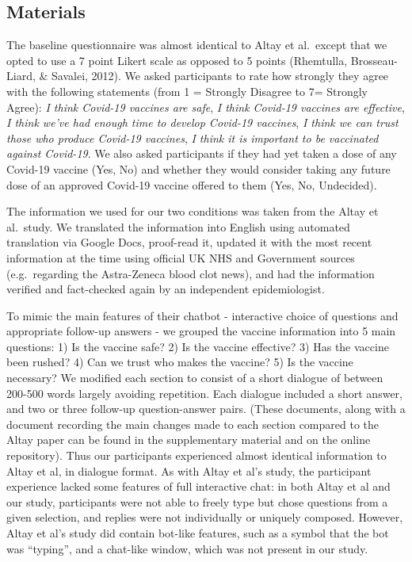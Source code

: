 \documentclass[
  english,
  ,jou,floatsintext]{apa6}
\begin{document}
\hypertarget{materials}{%
\subsection{Materials}\label{materials}}

The baseline questionnaire was almost identical to Altay et al.~except that we opted to use a 7 point Likert scale as opposed to 5 points (Rhemtulla, Brosseau-Liard, \& Savalei, 2012). We asked participants to rate how strongly they agree with the following statements (from 1 = Strongly Disagree to 7= Strongly Agree): \emph{I think Covid-19 vaccines are safe}, \emph{I think Covid-19 vaccines are effective}, \emph{I think we've had enough time to develop Covid-19 vaccines}, \emph{I think we can trust those who produce Covid-19 vaccines}, \emph{I think it is important to be vaccinated against Covid-19}. We also asked participants if they had yet taken a dose of any Covid-19 vaccine (Yes, No) and whether they would consider taking any future dose of an approved Covid-19 vaccine offered to them (Yes, No, Undecided).

The information we used for our two conditions was taken from the Altay et al.~study. We translated the information into English using automated translation via Google Docs, proof-read it, updated it with the most recent information at the time using official UK NHS and Government sources (e.g.~regarding the Astra-Zeneca blood clot news), and had the information verified and fact-checked again by an independent epidemiologist.

To mimic the main features of their chatbot - interactive choice of questions and appropriate follow-up answers - we grouped the vaccine information into 5 main questions: 1) Is the vaccine safe? 2) Is the vaccine effective? 3) Has the vaccine been rushed? 4) Can we trust who makes the vaccine? 5) Is the vaccine necessary? We modified each section to consist of a short dialogue of between 200-500 words largely avoiding repetition. Each dialogue included a short answer, and two or three follow-up question-answer pairs. (These documents, along with a document recording the main changes made to each section compared to the Altay paper can be found in the supplementary material and on the online repository). Thus our participants experienced almost identical information to Altay et al, in dialogue format. As with Altay et al's study, the participant experience lacked some features of full interactive chat: in both Altay et al and our study, participants were not able to freely type but chose questions from a given selection, and replies were not individually or uniquely composed. However, Altay et al's study did contain bot-like features, such as a symbol that the bot was ``typing'', and a chat-like window, which was not present in our study.
\end{document}
